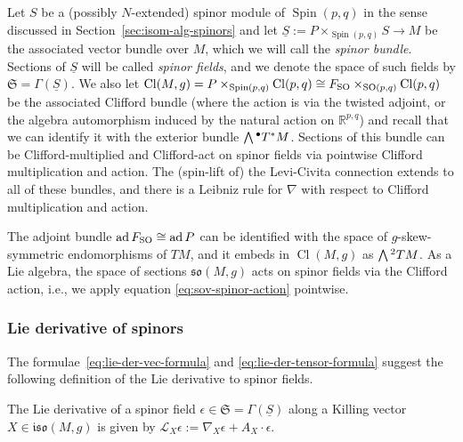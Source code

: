 \documentclass[10pt,a4paper]{amsart}
\numberwithin{equation}{section}
\newcommand{\fso}{\mathfrak{so}}
\newcommand{\fiso}{\mathfrak{iso}}
\newcommand{\fS}{\mathfrak{S}}
\newcommand{\RR}{\mathbb{R}}
\newcommand{\eL}{\mathscr{L}}
\newcommand{\Sbundle}{\underline{S}}
\newcommand{\Wedge}{\mathchoice{{\textstyle\bigwedge}}{\bigwedge}{\bigwedge}{\bigwedge}}	%
\newcommand{\1}{\mathbbm{1}}
\DeclareMathOperator{\Spin}{Spin}
\DeclareMathOperator{\SO}{SO}
\DeclareMathOperator{\Cl}{Cl}
\DeclareMathOperator{\ad}{ad}
\begin{document}
Let $S$ be a (possibly $N$-extended) spinor module of $\Spin(p,q)$ in the sense discussed in Section~\ref{sec:isom-alg-spinors} and let $\Sbundle:=P\times_{\Spin(p,q)} S\to M$ be the associated vector bundle over $M$, which we will call the \emph{spinor bundle}. Sections of $\Sbundle$ will be called \emph{spinor fields}, and we denote the space of such fields by $\fS=\Gamma(\Sbundle)$. We also let $\Cl(M,g)=P\times_{\Spin(p,q)}\Cl(p,q)\cong F_{\rm SO}\times_{\SO(p,q)}\Cl(p,q)$ be the associated Clifford bundle (where the action is via the twisted adjoint, or the algebra automorphism induced by the natural action on $\RR^{p,q}$) and recall that we can identify it with the exterior bundle $\Wedge^\bullet T^*M$. Sections of this bundle can be Clifford-multiplied and Clifford-act on spinor fields via pointwise Clifford multiplication and action. The (spin-lift of) the Levi-Civita connection extends to all of these bundles, and there is a Leibniz rule for $\nabla$ with respect to Clifford multiplication and action.

The adjoint bundle $\ad F_{\rm SO}\cong\ad P$ can be identified with the space of $g$-skew-symmetric endomorphisms of $TM$, and it embeds in $\Cl(M,g)$ as $\Wedge^2 TM$. As a Lie algebra, the space of sections $\fso(M,g)$ acts on spinor fields via the Clifford action, i.e., we apply equation \eqref{eq:sov-spinor-action} pointwise.

\subsubsection{Lie derivative of spinors}
\label{sec:lie-der-spinors}

The formulae~\eqref{eq:lie-der-vec-formula} and \eqref{eq:lie-der-tensor-formula} suggest the following definition of the Lie derivative to spinor fields.

\begin{Definition}\label{def:lie-der}
	The Lie derivative of a spinor field $\epsilon\in\fS=\Gamma(\Sbundle)$ along a Killing vector $X\in\fiso(M,g)$ is given by
$
		\eL_X \epsilon := \nabla_X \epsilon + A_X\cdot \epsilon$.
\end{Definition}
\end{document}
